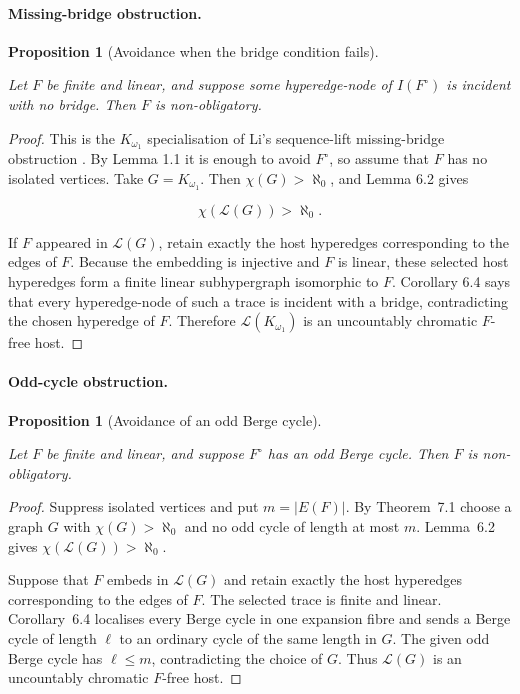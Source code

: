 \documentclass[a4paper,11pt,reqno]{amsart}
\theoremstyle{plain}
\newtheorem{proposition}[theorem]{Proposition}
\theoremstyle{definition}
\theoremstyle{remark}
\begin{document}
\paragraph{Missing-bridge obstruction.}\label{missing-bridge-obstruction}

\begin{proposition}[Avoidance when the bridge condition fails]\label{proposition-8.2-avoidance-when-the-bridge-condition-fails}

Let \(F\) be finite and linear, and suppose some hyperedge-node of \(I(F^\circ)\) is incident with no bridge. Then \(F\) is non-obligatory.

\end{proposition}
\begin{proof}
This is the $K_{\omega_1}$ specialisation of Li's sequence-lift
missing-bridge obstruction \citep[Section~4]{li2026}.  By Lemma 1.1 it is
enough to avoid \(F^\circ\), so assume that \(F\) has no isolated vertices.
Take \(G=K_{\omega_1}\). Then \(\chi(G)>\aleph_0\), and Lemma 6.2 gives

\[
\chi(\mathcal L(G))>\aleph_0.
\]

If \(F\) appeared in \(\mathcal L(G)\), retain exactly the host hyperedges corresponding to the edges of \(F\). Because the embedding is injective and \(F\) is linear, these selected host hyperedges form a finite linear subhypergraph isomorphic to \(F\). Corollary 6.4 says that every hyperedge-node of such a trace is incident with a bridge, contradicting the chosen hyperedge of \(F\). Therefore \(\mathcal L(K_{\omega_1})\) is an uncountably chromatic \(F\)-free host.
\end{proof}

\paragraph{Odd-cycle obstruction.}\label{odd-cycle-obstruction}

\begin{proposition}[Avoidance of an odd Berge cycle]\label{proposition-8.3-avoidance-of-an-odd-berge-cycle}

Let \(F\) be finite and linear, and suppose \(F^\circ\) has an odd Berge cycle. Then \(F\) is non-obligatory.

\end{proposition}
\begin{proof}
Suppress isolated vertices and put $m=|E(F)|$.  By Theorem~7.1 choose a graph
$G$ with $\chi(G)>\aleph_0$ and no odd cycle of length at most $m$.  Lemma~6.2
gives $\chi(\mathcal L(G))>\aleph_0$.

Suppose that $F$ embeds in $\mathcal L(G)$ and retain exactly the host
hyperedges corresponding to the edges of $F$.  The selected trace is finite
and linear.  Corollary~6.4 localises every Berge cycle in one expansion fibre
and sends a Berge cycle of length $\ell$ to an ordinary cycle of the same
length in $G$.  The given odd Berge cycle has $\ell\le m$, contradicting the
choice of $G$.  Thus $\mathcal L(G)$ is an uncountably chromatic $F$-free
host.
\end{proof}
\end{document}
